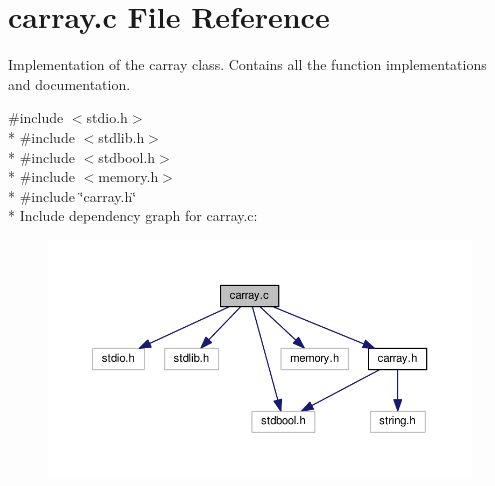 \section{carray.\+c File Reference}
\label{carray_8c}


Implementation of the carray class. Contains all the function implementations and documentation.  


{\ttfamily \#include $<$stdio.\+h$>$}\\*
{\ttfamily \#include $<$stdlib.\+h$>$}\\*
{\ttfamily \#include $<$stdbool.\+h$>$}\\*
{\ttfamily \#include $<$memory.\+h$>$}\\*
{\ttfamily \#include \char`\"{}carray.\+h\char`\"{}}\\*
Include dependency graph for carray.\+c\+:\nopagebreak
\begin{figure}[H]
\begin{center}
\leavevmode
\includegraphics[width=350pt]{carray_8c__incl}
\end{center}
\end{figure}
